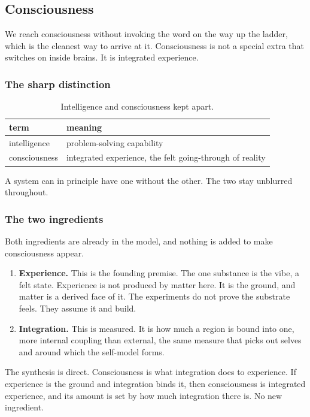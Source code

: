 \subsection{Consciousness}

We reach consciousness without invoking the word on the way up the ladder, which is the cleanest way to arrive at it. Consciousness is not a special extra that switches on inside brains. It is integrated experience.

\subsubsection{The sharp distinction}

\begin{table}[ht]
\centering
\begin{tabular}{@{}ll@{}}
\toprule
term & meaning \\
\midrule
intelligence & problem-solving capability \\
consciousness & integrated experience, the felt going-through of reality \\
\bottomrule
\end{tabular}
\caption{Intelligence and consciousness kept apart.}
\label{tab:int-vs-cons}
\end{table}

A system can in principle have one without the other. The two stay unblurred throughout.

\subsubsection{The two ingredients}

Both ingredients are already in the model, and nothing is added to make consciousness appear.

\begin{enumerate}
\item \textbf{Experience.} This is the founding premise. The one substance is the vibe, a felt state. Experience is not produced by matter here. It is the ground, and matter is a derived face of it. The experiments do not prove the substrate feels. They assume it and build.
\item \textbf{Integration.} This is measured. It is how much a region is bound into one, more internal coupling than external, the same measure that picks out selves and around which the self-model forms.
\end{enumerate}

The synthesis is direct. Consciousness is what integration does to experience. If experience is the ground and integration binds it, then consciousness is integrated experience, and its amount is set by how much integration there is. No new ingredient.

